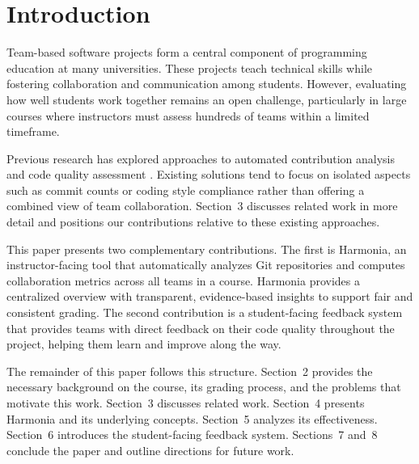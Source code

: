 \documentclass[sigconf]{acmart}
\begin{document}

\maketitle

\section{Introduction}

Team-based software projects form a central component of programming education at many universities. These projects teach technical skills while fostering collaboration and communication among students. However, evaluating how well students work together remains an open challenge, particularly in large courses where instructors must assess hundreds of teams within a limited timeframe.

Previous research has explored approaches to automated contribution analysis and code quality assessment \cite{ferrao2025llm, hundhausen2023combining, chen2022codequality, ramesh2025ericsson}. Existing solutions tend to focus on isolated aspects such as commit counts or coding style compliance rather than offering a combined view of team collaboration. Section~3 discusses related work in more detail and positions our contributions relative to these existing approaches.

This paper presents two complementary contributions. The first is Harmonia, an instructor-facing tool that automatically analyzes Git repositories and computes collaboration metrics across all teams in a course. Harmonia provides a centralized overview with transparent, evidence-based insights to support fair and consistent grading. The second contribution is a student-facing feedback system that provides teams with direct feedback on their code quality throughout the project, helping them learn and improve along the way.

The remainder of this paper follows this structure. Section~2 provides the necessary background on the course, its grading process, and the problems that motivate this work. Section~3 discusses related work. Section~4 presents Harmonia and its underlying concepts. Section~5 analyzes its effectiveness. Section~6 introduces the student-facing feedback system. Sections~7 and~8 conclude the paper and outline directions for future work.
\end{document}
